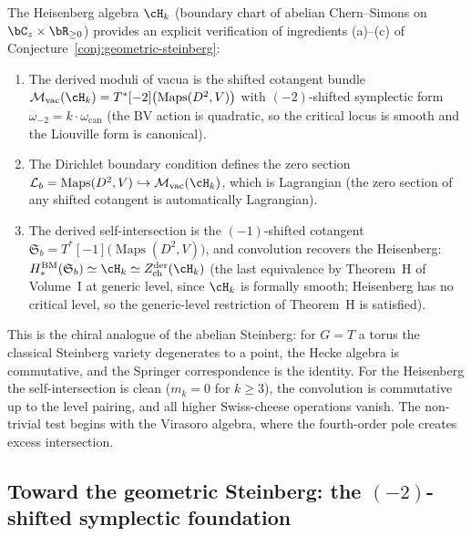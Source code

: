 \begin{example}
\label{ex:geometric-steinberg-heisenberg}
The Heisenberg algebra $\cH_k$ (boundary chart of abelian
Chern--Simons on $\bC_z \times \bR_{\ge 0}$) provides an explicit
verification of ingredients (a)--(c) of
Conjecture~\ref{conj:geometric-steinberg}:
\begin{enumerate}[label=\textup{(\alph*)}]
\item The derived moduli of vacua is the shifted cotangent bundle
 $\cM_{\mathrm{vac}}(\cH_k) =
 T^*[-2]\bigl(\operatorname{Maps}(D^2, V)\bigr)$
 with $(-2)$-shifted symplectic form
 $\omega_{-2} = k \cdot \omega_{\mathrm{can}}$
 (the BV action is quadratic, so the critical locus is smooth
 and the Liouville form is canonical).
\item The Dirichlet boundary condition defines the zero section
 $\cL_b = \operatorname{Maps}(D^2, V)
 \hookrightarrow \cM_{\mathrm{vac}}(\cH_k)$,
 which is Lagrangian (the zero section of any shifted cotangent
 is automatically Lagrangian).
\item The derived self-intersection is the $(-1)$-shifted cotangent
 $\mathfrak{S}_b = T^*[-1]\bigl(\operatorname{Maps}(D^2, V)\bigr)$,
 and convolution recovers the Heisenberg:
 $H_*^{\mathrm{BM}}(\mathfrak{S}_b) \simeq \cH_k \simeq
 Z^{\mathrm{der}}_{\mathrm{ch}}(\cH_k)$
 (the last equivalence by Theorem~H of Volume~I at generic level,
 since $\cH_k$ is formally smooth; Heisenberg has no critical level,
 so the generic-level restriction of Theorem~H is satisfied).
\end{enumerate}
This is the chiral analogue of the abelian Steinberg: for $G = T$ a
torus the classical Steinberg variety degenerates to a point, the
Hecke algebra is commutative, and the Springer correspondence is the
identity. For the Heisenberg the self-intersection is clean
($m_k = 0$ for $k \ge 3$), the convolution is commutative up to the
level pairing, and all higher Swiss-cheese operations vanish. The
non-trivial test begins with the Virasoro algebra, where the
fourth-order pole creates excess intersection.
\end{example}

\subsection{Toward the geometric Steinberg: the $(-2)$-shifted symplectic foundation}
\label{ssec:geometric-steinberg-foundation}

